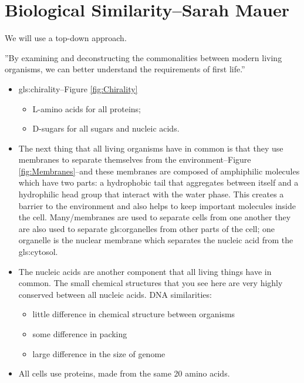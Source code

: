 \documentclass[]{article}
\begin{document}
\section[Biological Similarity]{Biological Similarity--Sarah Mauer}

We will use a top-down approach.

 ''By examining and deconstructing the commonalities between modern living organisms, we can better understand the requirements of first life.''

\begin{itemize}
	\item \Gls{gls:chirality}--Figure \ref{fig:Chirality}
	\begin{itemize}
		\item L-amino acids for all proteins;
		\item D-sugars for all sugars and nucleic acids.
	\end{itemize}
	\item The next thing that all living organisms have in common
	is that they use membranes to separate themselves from the environment--Figure \ref{fig:Membranes}--and these membranes are composed of amphiphilic molecules which have two parts:  a hydrophobic tail that aggregates between itself and a hydrophilic head group that interact with the water phase. This creates a barrier to the environment and also helps to keep important molecules inside the cell.
	Many/membranes are used to separate cells from one another they are also used
	to separate \glspl{gls:organelle} from other parts of the cell;
	one organelle is the nuclear membrane which separates the nucleic acid from the \gls{gls:cytosol}.
	\item The nucleic acids are another component that all living things have in common. The small chemical structures that you see here are very highly conserved between all nucleic acids. DNA similarities:\begin{itemize}
		\item little difference in chemical structure between organisms
		\item some difference in packing
		\item large difference in the size of genome
	\end{itemize}
	\item All cells use proteins, made from the same 20 amino acids.
\end{itemize}
\end{document}
